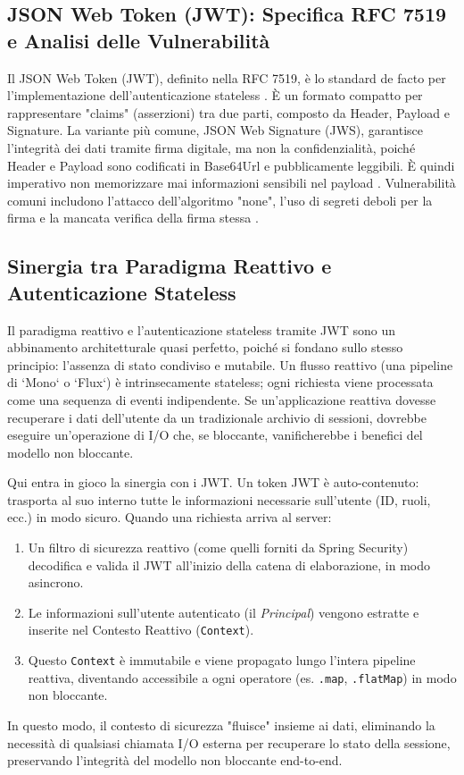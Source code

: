 \documentclass[12pt,a4paper,openright,twoside]{book}
\begin{document}
\subsection{JSON Web Token (JWT): Specifica RFC 7519 e Analisi delle Vulnerabilità}
Il JSON Web Token (JWT), definito nella RFC 7519, è lo standard de facto per l'implementazione dell'autenticazione stateless \cite{rfc7519}. È un formato compatto per rappresentare "claims" (asserzioni) tra due parti, composto da Header, Payload e Signature. La variante più comune, JSON Web Signature (JWS), garantisce l'integrità dei dati tramite firma digitale, ma non la confidenzialità, poiché Header e Payload sono codificati in Base64Url e pubblicamente leggibili. È quindi imperativo non memorizzare mai informazioni sensibili nel payload \cite{rana2023enhancing}. Vulnerabilità comuni includono l'attacco dell'algoritmo "none", l'uso di segreti deboli per la firma e la mancata verifica della firma stessa \cite{owasp_jwt_cheatsheet}.

\subsection{Sinergia tra Paradigma Reattivo e Autenticazione Stateless}
Il paradigma reattivo e l'autenticazione stateless tramite JWT sono un abbinamento architetturale quasi perfetto, poiché si fondano sullo stesso principio: l'assenza di stato condiviso e mutabile. Un flusso reattivo (una pipeline di `Mono` o `Flux`) è intrinsecamente stateless; ogni richiesta viene processata come una sequenza di eventi indipendente. Se un'applicazione reattiva dovesse recuperare i dati dell'utente da un tradizionale archivio di sessioni, dovrebbe eseguire un'operazione di I/O che, se bloccante, vanificherebbe i benefici del modello non bloccante.

Qui entra in gioco la sinergia con i JWT. Un token JWT è auto-contenuto: trasporta al suo interno tutte le informazioni necessarie sull'utente (ID, ruoli, ecc.) in modo sicuro. Quando una richiesta arriva al server:
\begin{enumerate}
    \item Un filtro di sicurezza reattivo (come quelli forniti da Spring Security) decodifica e valida il JWT all'inizio della catena di elaborazione, in modo asincrono.
    \item Le informazioni sull'utente autenticato (il \textit{Principal}) vengono estratte e inserite nel Contesto Reattivo (\texttt{Context}).
    \item Questo \texttt{Context} è immutabile e viene propagato lungo l'intera pipeline reattiva, diventando accessibile a ogni operatore (es. \texttt{.map}, \texttt{.flatMap}) in modo non bloccante.
\end{enumerate}
In questo modo, il contesto di sicurezza "fluisce" insieme ai dati, eliminando la necessità di qualsiasi chiamata I/O esterna per recuperare lo stato della sessione, preservando l'integrità del modello non bloccante end-to-end.
\end{document}
